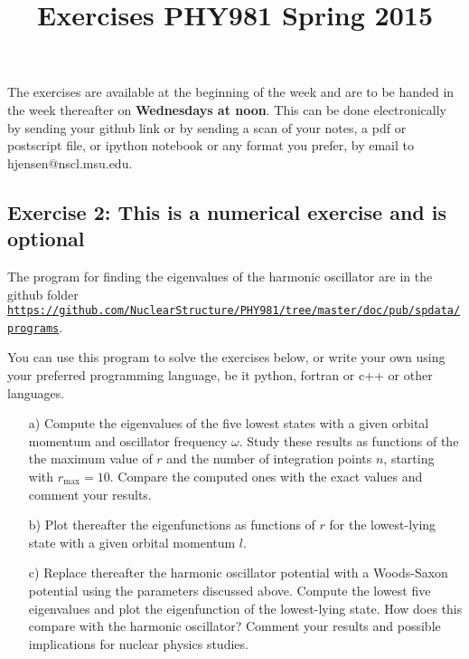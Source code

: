 \documentclass[prc]{revtex4}
\begin{document}
\title{Exercises PHY981 Spring 2015}
\maketitle
The exercises are available at the beginning of the 
week and are  to be handed in 
the week thereafter on {\bf Wednesdays at noon}. This can be done electronically by sending your github link or by sending a scan of your notes, a pdf or postscript file, or ipython notebook or any format you prefer,  by email to 
hjensen@nscl.msu.edu. 

\subsection*{Exercise 2: This is a numerical exercise and is optional}


The program for finding the eigenvalues of the harmonic oscillator are in the github folder
\href{{https://github.com/NuclearStructure/PHY981/tree/master/doc/pub/spdata/programs}}{\nolinkurl{https://github.com/NuclearStructure/PHY981/tree/master/doc/pub/spdata/programs}}.

You can use this program to solve the exercises below, or write your own using your preferred programming language, be it python, fortran or c++ or other languages. 
\begin{enumerate}
\item[a)] Compute the eigenvalues of the five lowest states with a given orbital momentum and oscillator frequency $\omega$. Study these results as functions of the the maximum value of $r$ and the number of integration points $n$, starting with  $r_{\mathrm{max}}=10$. Compare the computed ones with the exact values and comment your results.

\item[b)]  Plot thereafter the eigenfunctions as functions of $r$ for the lowest-lying state with a given orbital momentum $l$.

\item[c)]  Replace thereafter the harmonic oscillator potential with a Woods-Saxon potential using the parameters discussed above. Compute the lowest five eigenvalues and plot the eigenfunction of the lowest-lying state. How does this compare with the harmonic oscillator? Comment your results and possible implications for nuclear physics studies.
\end{enumerate}
\end{document}
